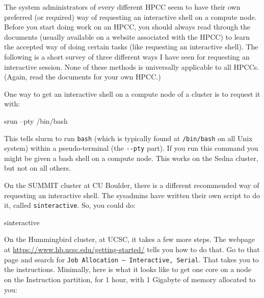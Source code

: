 \documentclass[]{krantz}
\makeatletter
\newenvironment{Shaded}{\begin{snugshade}}{\end{snugshade}}
\newcommand{\CommentTok}[1]{\textcolor[rgb]{0.37,0.37,0.37}{\textit{#1}}}
\newcommand{\ExtensionTok}[1]{#1}
\newcommand{\NormalTok}[1]{#1}
\newcommand{\VariableTok}[1]{\textcolor[rgb]{0,0,0}{#1}}
\newenvironment{kframe}{%
\medskip{}
\setlength{\fboxsep}{.8em}
 \def\at@end@of@kframe{}%
 \ifinner\ifhmode%
  \def\at@end@of@kframe{\end{minipage}}%
  \begin{minipage}{\columnwidth}%
 \fi\fi%
 \def\FrameCommand##1{\hskip\@totalleftmargin \hskip-\fboxsep
 \colorbox{shadecolor}{##1}\hskip-\fboxsep
     \hskip-\linewidth \hskip-\@totalleftmargin \hskip\columnwidth}%
 \MakeFramed {\advance\hsize-\width
   \@totalleftmargin\z@ \linewidth\hsize
   \@setminipage}}%
 {\par\unskip\endMakeFramed%
 \at@end@of@kframe}
\renewenvironment{Shaded}{\begin{kframe}}{\end{kframe}}
\makeatother
\begin{document}
The system administrators of every different HPCC seem to have their own preferred (or required)
way of requesting an interactive shell on a compute node. Before you start doing work
on an HPCC, you should always read through the documents (usually available on a website
associated with the HPCC) to learn the accepted way of doing certain tasks (like requesting
an interactive shell). The following is a short survey of three different ways I have
seen for requesting an interactive session. None of these methods is universally applicable
to all HPCCs. (Again, read the documents for your own HPCC.)

One way to get an interactive shell on a compute node of a cluster is to request it with:

\begin{Shaded}
\begin{Highlighting}[]
\ExtensionTok{srun}\NormalTok{ --pty /bin/bash}
\end{Highlighting}
\end{Shaded}

This tells slurm to run \texttt{bash} (which is typically found at \texttt{/bin/bash} on all Unix system) within
a pseudo-terminal (the \texttt{-\/-pty} part). If you run this command you might be given a bash shell on a compute
node. This works on the Sedna cluster, but not on all others.

On the SUMMIT cluster at CU Boulder, there is
a different recommended way of requesting an interactive shell. The
sysadmins have written their own script to do it, called \texttt{sinteractive}.
So, you could do:

\begin{Shaded}
\begin{Highlighting}[]
\ExtensionTok{sinteractive}
\end{Highlighting}
\end{Shaded}

On the Hummingbird cluster, at UCSC, it takes a few more steps. The webpage at \url{https://www.hb.ucsc.edu/getting-started/}
tells you how to do that. Go to that page and search for \texttt{Job\ Allocation\ –\ Interactive,\ Serial}. That takes you to
the instructions. Minimally, here is what it looks like to get one core
on a node on the Instruction partition, for 1 hour, with 1 Gigabyte of memory
allocated to you:

\begin{Shaded}
\end{Shaded}
\end{document}
